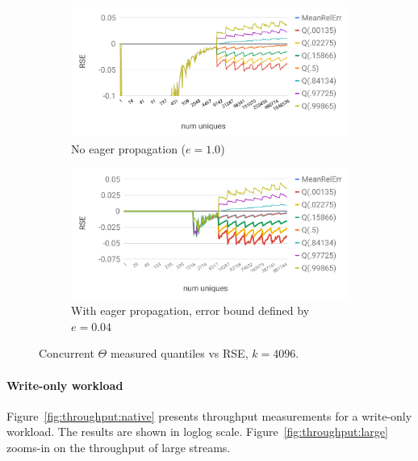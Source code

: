 \begin{figure}[tb]
    \setlength{\abovecaptionskip}{0pt}
    \setlength{\belowcaptionskip}{0pt}
    \setlength\textfloatsep{0pt}
    \centering
    \begin{subfigure}{\columnwidth}\centering
    \includegraphics[width=\textwidth]{images/theta-accuracy.pdf}
    \caption{No eager propagation ($e=1.0$)}
    \label{fig:accuracy}
    \end{subfigure}
    \begin{subfigure}{\columnwidth}\centering
    \includegraphics[width=\textwidth]{images/theta-accuracy-adaptive.pdf}
    \caption{With eager propagation, error bound defined by $e=0.04$}
    \label{fig:accuracy-adaptive}
    \end{subfigure}
      \caption{Concurrent $\Theta$ measured quantiles vs RSE, $k = 4096$.}
      \label{fig:accuracy-res}
\end{figure}

\paragraph{Write-only workload}
Figure~\ref{fig:throughput:native} presents throughput measurements for a write-only workload. The results are shown in loglog scale.
Figure~\ref{fig:throughput:large} zooms-in on the throughput of large streams.

